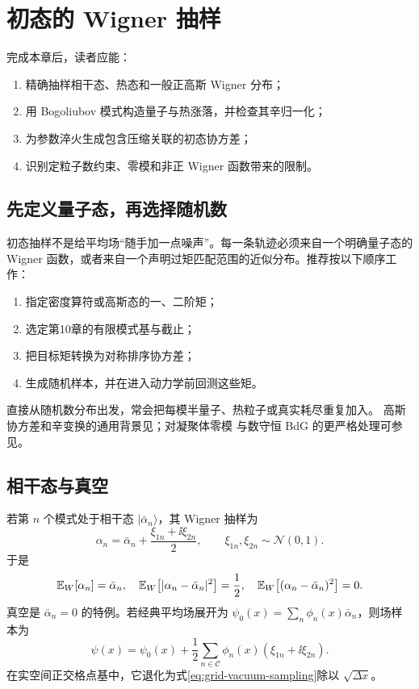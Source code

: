 \chapter{初态的 Wigner 抽样}
\label{ch:initial-sampling}

\begin{learningobjectives}
完成本章后，读者应能：
\begin{enumerate}
  \item 精确抽样相干态、热态和一般正高斯 Wigner 分布；
  \item 用 Bogoliubov 模式构造量子与热涨落，并检查其辛归一化；
  \item 为参数淬火生成包含压缩关联的初态协方差；
  \item 识别定粒子数约束、零模和非正 Wigner 函数带来的限制。
\end{enumerate}
\end{learningobjectives}

\section{先定义量子态，再选择随机数}

初态抽样不是给平均场“随手加一点噪声”。每一条轨迹必须来自一个明确量子态的 Wigner 函数，或者来自一个声明过矩匹配范围的近似分布。推荐按以下顺序工作：
\begin{enumerate}
  \item 指定密度算符或高斯态的一、二阶矩；
  \item 选定第10章的有限模式基与截止；
  \item 把目标矩转换为对称排序协方差；
  \item 生成随机样本，并在进入动力学前回测这些矩。
\end{enumerate}
直接从随机数分布出发，常会把每模半量子、热粒子或真实耗尽重复加入。
高斯协方差和辛变换的通用背景见\cite{Weedbrook2012}；对凝聚体零模
与数守恒 BdG 的更严格处理可参见\cite{Castin1998}。

\section{相干态与真空}

若第 $n$ 个模式处于相干态 $|\bar\alpha_n\rangle$，其 Wigner 抽样为
\begin{equation}
  \alpha_n=\bar\alpha_n+\frac{\xi_{1n}+\ii\xi_{2n}}{2},
  \qquad
  \xi_{1n},\xi_{2n}\sim\mathcal N(0,1).
  \label{eq:coherent-mode-sampling}
\end{equation}
于是
\begin{equation}
  \mathbb{E}_{W}\!\left[\alpha_n\right]=\bar\alpha_n,
  \quad
  \mathbb{E}_{W}\!\left[|\alpha_n-\bar\alpha_n|^2\right]=\frac12,
  \quad
  \mathbb{E}_{W}\!\left[(\alpha_n-\bar\alpha_n)^2\right]=0.
  \label{eq:coherent-mode-moments}
\end{equation}
真空是 $\bar\alpha_n=0$ 的特例。若经典平均场展开为
$\psi_0(x)=\sum_n\phi_n(x)\bar\alpha_n$，则场样本为
\begin{equation}
  \psi(x)=\psi_0(x)
  +\frac12\sum_{n\in\mathcal C}\phi_n(x)
  (\xi_{1n}+\ii\xi_{2n}).
  \label{eq:coherent-field-sampling}
\end{equation}
在实空间正交格点基中，它退化为式\eqref{eq:grid-vacuum-sampling}除以 $\sqrt{\Delta x}$。

